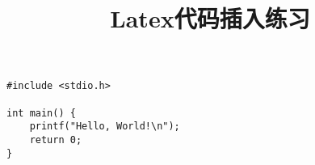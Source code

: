 \documentclass[UTF8]{article}
\title{Latex代码插入练习}
\begin{document}
\maketitle

\begin{verbatim}
#include <stdio.h>

int main() {
    printf("Hello, World!\n");
    return 0;
}
\end{verbatim}
\end{document}
